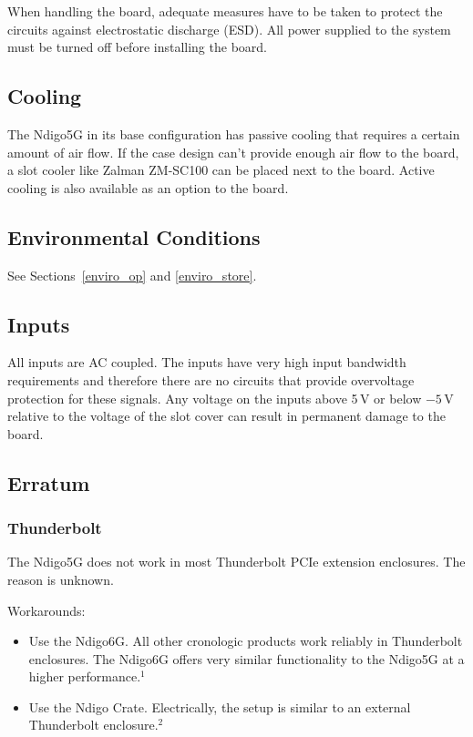     When handling the board, adequate measures have to be taken to protect the circuits against electrostatic discharge (ESD). All power supplied to the system must be turned off before installing the board.

\subsection{Cooling}

    The Ndigo5G in its base configuration has passive cooling that requires a certain amount of air flow. If the case design can't provide enough air flow to the board, a slot cooler like Zalman ZM-SC100 can be placed next to the board. Active cooling is also available as an option to the board.

\subsection{Environmental Conditions}
    See Sections~\ref{enviro_op} and \ref{enviro_store}.

\subsection{Inputs}

    All inputs are AC coupled. The inputs have very high input bandwidth requirements and therefore there are no circuits that provide overvoltage protection for these signals. Any voltage on the inputs above 5\,V or below $-5$\,V relative to the voltage of the slot cover can result in permanent damage to the board.

\subsection{Erratum}
\label{sec:erratum}

\subsubsection{Thunderbolt}
The Ndigo5G does not work in most Thunderbolt PCIe extension enclosures. The reason is unknown.\par
Workarounds:
\begin{itemize}
    \item Use the Ndigo6G. All other cronologic products work reliably in Thunderbolt enclosures. The Ndigo6G offers very similar functionality to the Ndigo5G at a higher performance.$^1$
    \item Use the Ndigo Crate. Electrically, the setup is similar to an external Thunderbolt enclosure.$^2$ 
\end{itemize}

